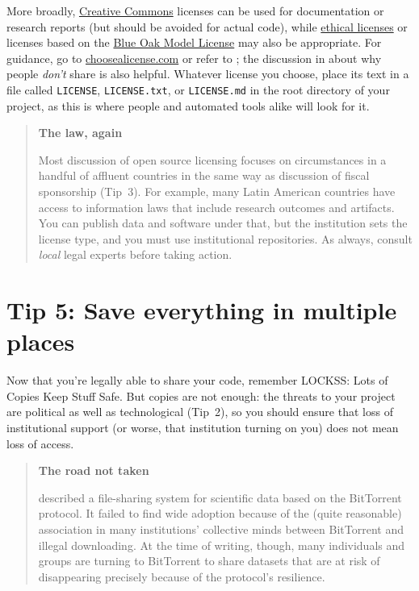 \documentclass[10pt,letterpaper]{article}
\begin{document}
More broadly,
\href{https://creativecommons.org/}{Creative Commons} licenses can be used for documentation or research reports (but should be avoided for actual code),
while \href{https://ethicalsource.dev/}{ethical licenses}
or licenses based on the \href{https://blueoakcouncil.org/license/1.0.0}{Blue Oak Model License} may also be appropriate.
For guidance,
go to \href{http://choosealicense.com}{choosealicense.com}
or refer to \cite{Fogel2020,Fortunato2021};
the discussion in \cite{Gomes2022} about why people \emph{don't} share is also helpful.
Whatever license you choose,
place its text in a file called \texttt{LICENSE}, \texttt{LICENSE.txt}, or \texttt{LICENSE.md}
in the root directory of your project,
as this is where people and automated tools alike will look for it.

\begin{quote}
  \noindent
  \textbf{The law, again}

  Most discussion of open source licensing focuses on circumstances in a handful of affluent countries
  in the same way as discussion of fiscal sponsorship (Tip~3).
  For example,
  many Latin American countries have access to information laws that include research outcomes and artifacts.
  You can publish data and software under that,
  but the institution sets the license type,
  and you must use institutional repositories.
  As always,
  consult \emph{local} legal experts before taking action.
\end{quote}

\section*{Tip 5: Save everything in multiple places}

Now that you're legally able to share your code, remember LOCKSS: Lots of Copies Keep Stuff Safe.
But copies are not enough:
the threats to your project are political as well as technological (Tip~2),
so you should ensure that loss of institutional support
(or worse, that institution turning on you)
does not mean loss of access.

\begin{quote}
  \noindent
  \textbf{The road not taken}

  \cite{Langille2010} described a file-sharing system for scientific data
  based on the BitTorrent protocol.
  It failed to find wide adoption because of the (quite reasonable) association in many institutions' collective minds
  between BitTorrent and illegal downloading.
  At the time of writing,
  though,
  many individuals and groups are turning to BitTorrent to share datasets that are at risk of disappearing
  precisely because of the protocol's resilience.
\end{quote}
\end{document}
